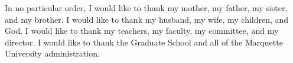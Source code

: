 \begin{acknowledgments}
  In no particular order, I would like to thank my mother, my father, my sister, and my
  brother.  I would like to thank my husband, my wife, my children, and God. I would like
  to thank my teachers, my faculty, my committee, and my director.  I would like to thank
  the Graduate School and all of the Marquette University administration.
\end{acknowledgments}
